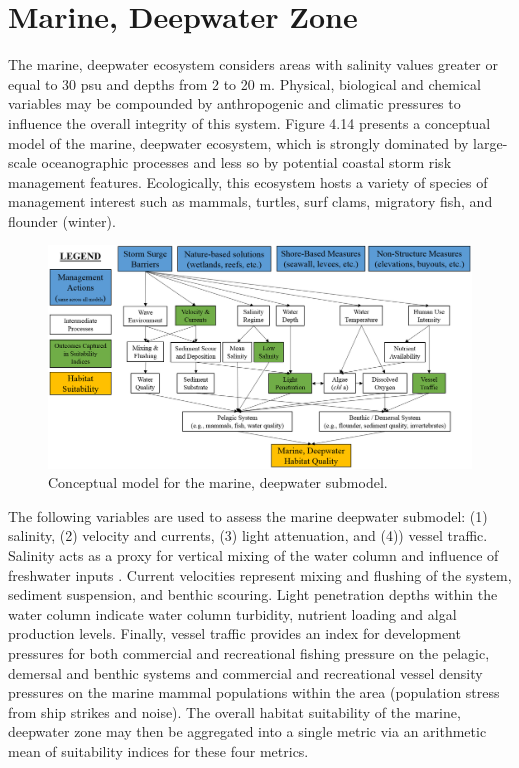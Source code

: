 \documentclass[
]{book}
\begin{document}
\hypertarget{marine-deepwater-zone}{%
\section{Marine, Deepwater Zone}\label{marine-deepwater-zone}}

The marine, deepwater ecosystem considers areas with salinity values greater or equal to 30 psu and depths from 2 to 20 m. Physical, biological and chemical variables may be compounded by anthropogenic and climatic pressures to influence the overall integrity of this system. Figure 4.14 presents a conceptual model of the marine, deepwater ecosystem, which is strongly dominated by large-scale oceanographic processes and less so by potential coastal storm risk management features. Ecologically, this ecosystem hosts a variety of species of management interest such as mammals, turtles, surf clams, migratory fish, and flounder (winter).

\begin{figure}
\includegraphics[width=21.75in]{ZZ_Fig04.14_Mar.Deep_ConModel} \caption{Conceptual model for the marine, deepwater submodel.}\label{fig:unnamed-chunk-22}
\end{figure}

The following variables are used to assess the marine deepwater submodel: (1) salinity, (2) velocity and currents, (3) light attenuation, and (4)) vessel traffic. Salinity acts as a proxy for vertical mixing of the water column and influence of freshwater inputs \citep{smit_assessing_2021}. Current velocities represent mixing and flushing of the system, sediment suspension, and benthic scouring. Light penetration depths within the water column indicate water column turbidity, nutrient loading and algal production levels. Finally, vessel traffic provides an index for development pressures for both commercial and recreational fishing pressure on the pelagic, demersal and benthic systems and commercial and recreational vessel density pressures on the marine mammal populations within the area (population stress from ship strikes and noise). The overall habitat suitability of the marine, deepwater zone may then be aggregated into a single metric via an arithmetic mean of suitability indices for these four metrics.
\end{document}
